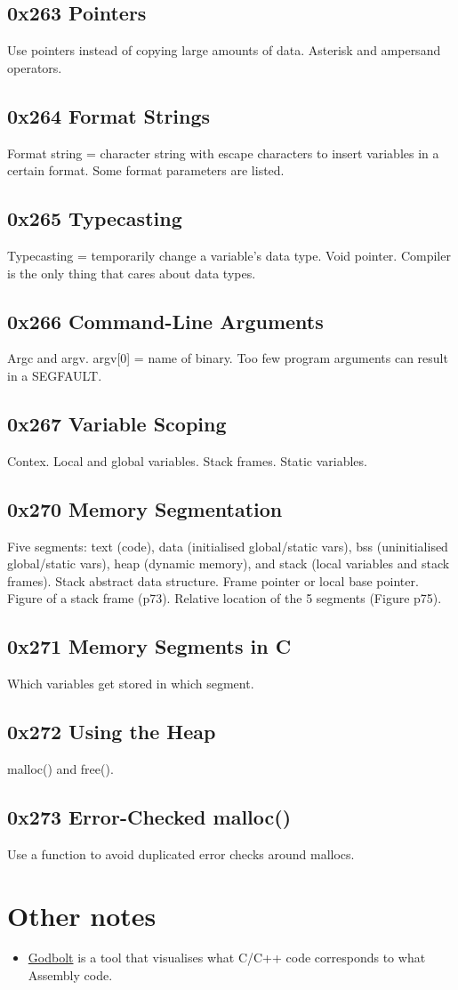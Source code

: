 \documentclass[letterpaper]{article}
\begin{document}
\subsection*{0x263 Pointers}
Use pointers instead of copying large amounts of data. Asterisk and ampersand operators.
\subsection*{0x264 Format Strings}
Format string = character string with escape characters to insert variables in a certain format. Some format parameters are listed.
\subsection*{0x265 Typecasting}
Typecasting = temporarily change a variable's data type. Void pointer. Compiler is the only thing that cares about data types.
\subsection*{0x266 Command-Line Arguments}
Argc and argv. argv[0] = name of binary. Too few program arguments can result in a SEGFAULT.
\subsection*{0x267 Variable Scoping}
Contex. Local and global variables. Stack frames. Static variables.
\subsection*{0x270 Memory Segmentation}
Five segments: text (code), data (initialised global/static vars), bss (uninitialised global/static vars), heap (dynamic memory), and stack (local variables and stack frames). Stack abstract data structure. Frame pointer or local base pointer. Figure of a stack frame (p73). Relative location of the 5 segments (Figure p75).  
\subsection*{0x271 Memory Segments in C}
Which variables get stored in which segment.
\subsection*{0x272 Using the Heap}
malloc() and free().
\subsection*{0x273 Error-Checked malloc()}
Use a function to avoid duplicated error checks around mallocs.

\section{Other notes}
\begin{itemize}
\item \href{http://gcc.godbolt.org}{Godbolt} is a tool that visualises what C/C++ code corresponds to what Assembly code.
\end{itemize}
\end{document}
